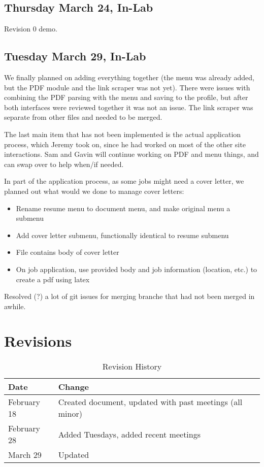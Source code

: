 \documentclass{article}
\begin{document}
\subsection{Thursday March 24, In-Lab}
Revision 0 demo.

\subsection{Tuesday March 29, In-Lab}
We finally planned on adding everything together (the menu was already added, but the PDF module and the link scraper was not yet). There were issues with combining the PDF parsing with the menu and saving to the profile, but after both interfaces were reviewed together it was not an issue. The link scraper was separate from other files and needed to be merged. 

The last main item that has not been implemented is the actual application process, which Jeremy took on, since he had worked on most of the other site interactions. Sam and Gavin will continue working on PDF and menu things, and can swap over to help when/if needed.

In part of the application process, as some jobs might need a cover letter, we planned out what would we done to manage cover letters:
\begin{itemize}
	\item Rename resume menu to document menu, and make original menu a submenu
	\item Add cover letter submenu, functionally identical to resume submenu
	\item File contains body of cover letter
	\item On job application, use provided body and job information (location, etc.) to create a pdf using latex
\end{itemize} 

Resolved (?) a lot of git issues for merging branche that had not been merged in awhile.

\newpage

\section{Revisions}

\begin{table}[hp]
\caption{Revision History} \label{tbl:rev}
\begin{tabularx}{\textwidth}{lX}
\toprule
\textbf{Date} & \textbf{Change}\\
\midrule
February 18& Created document, updated with past meetings (all minor) \\
February 28 & Added Tuesdays, added recent meetings \\
March 29 & Updated \\
\bottomrule
\end{tabularx}
\end{table}
\end{document}
